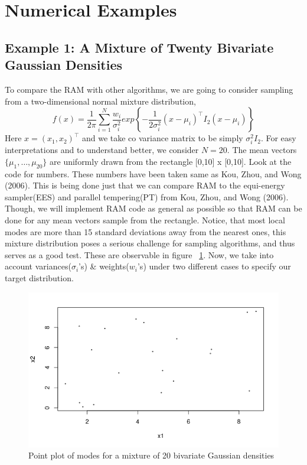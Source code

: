\documentclass{article}
\begin{document}
\section{Numerical Examples}
\subsection{Example 1: A Mixture of Twenty Bivariate Gaussian
Densities
}
To compare the RAM with other algorithms, we are going to consider sampling from a two-dimensional normal mixture distribution,
\begin{equation*}
    f(x)=\frac{1}{2\pi}\sum_{i=1}^N \frac{w_i}{\sigma_i^2} exp\left\{-\frac{1}{2 \sigma_i^2}(x-\mu_i)^\top I_2 (x-\mu_i)\right\}
\end{equation*}
Here $x=(x_1,x_2)^\top$ and we take co variance matrix to be simply $\sigma_i^2 I_2$. For easy interpretations and to understand better, we consider $N=20$. The mean vectors $\{\mu_1,\ldots,\mu_{20}\}$ are uniformly drawn from the rectangle [0,10] x [0,10]. Look at the code for numbers. These numbers have been taken same as Kou, Zhou, and Wong (2006). This is being done just that we can compare RAM to the equi-energy sampler(EES) and parallel tempering(PT) from Kou, Zhou, and Wong (2006). Though, we will implement RAM code as general as possible so that RAM can be done for any mean vectors sample from the rectangle. Notice, that most local modes are more than 15 standard deviations away from the nearest ones, this mixture distribution poses a serious challenge for sampling algorithms, and thus serves as a good test. These are observable in figure ~\ref{fig:exa1.1}. Now, we take into account variances($\sigma_i$'s) \& weights($w_i$'s) under two different cases to specify our target distribution.
\begin{figure}[ht]
    \centering
    \includegraphics[width=\textwidth]{1.png}
    \caption{Point plot of modes for a mixture of 20 bivariate Gaussian densities}
    \label{fig:exa1.1}
\end{figure}
\end{document}

